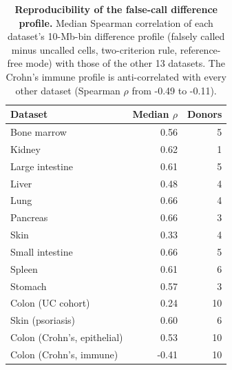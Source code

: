 \begin{table}[htbp]
\centering
\caption{\textbf{Reproducibility of the false-call difference profile.} Median Spearman correlation of each dataset's 10-Mb-bin difference profile (falsely called minus uncalled cells, two-criterion rule, reference-free mode) with those of the other 13 datasets. The Crohn's immune profile is anti-correlated with every other dataset (Spearman $\rho$ from -0.49 to -0.11).}
\label{tab:s5}
\small
\begin{tabular}{@{}lrr@{}}
\toprule
Dataset & Median $\rho$ & Donors \\
\midrule
Bone marrow & 0.56 & 5 \\
Kidney & 0.62 & 1 \\
Large intestine & 0.61 & 5 \\
Liver & 0.48 & 4 \\
Lung & 0.66 & 4 \\
Pancreas & 0.66 & 3 \\
Skin & 0.33 & 4 \\
Small intestine & 0.66 & 5 \\
Spleen & 0.61 & 6 \\
Stomach & 0.57 & 3 \\
Colon (UC cohort) & 0.24 & 10 \\
Skin (psoriasis) & 0.60 & 6 \\
Colon (Crohn's, epithelial) & 0.53 & 10 \\
Colon (Crohn's, immune) & -0.41 & 10 \\
\bottomrule
\end{tabular}
\end{table}
